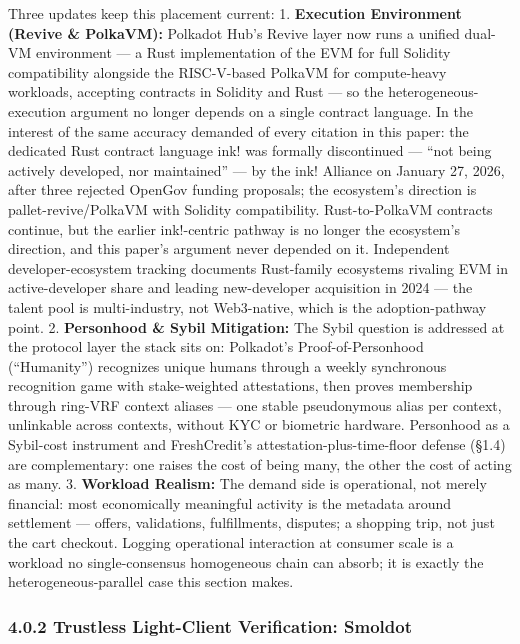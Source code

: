 \documentclass[
]{article}
\begin{document}
Three updates keep this placement current: 1. \textbf{Execution
Environment (Revive \& PolkaVM):} Polkadot Hub's Revive layer now runs a
unified dual-VM environment --- a Rust implementation of the EVM for
full Solidity compatibility alongside the RISC-V-based PolkaVM for
compute-heavy workloads, accepting contracts in Solidity and Rust --- so
the heterogeneous-execution argument no longer depends on a single
contract language. In the interest of the same accuracy demanded of
every citation in this paper: the dedicated Rust contract language ink!
was formally discontinued --- ``not being actively developed, nor
maintained'' --- by the ink! Alliance on January 27, 2026, after three
rejected OpenGov funding proposals; the ecosystem's direction is
pallet-revive/PolkaVM with Solidity compatibility. Rust-to-PolkaVM
contracts continue, but the earlier ink!-centric pathway is no longer
the ecosystem's direction, and this paper's argument never depended on
it. Independent developer-ecosystem tracking documents Rust-family
ecosystems rivaling EVM in active-developer share and leading
new-developer acquisition in 2024 --- the talent pool is multi-industry,
not Web3-native, which is the adoption-pathway point. 2.
\textbf{Personhood \& Sybil Mitigation:} The Sybil question is addressed
at the protocol layer the stack sits on: Polkadot's Proof-of-Personhood
(``Humanity'') recognizes unique humans through a weekly synchronous
recognition game with stake-weighted attestations, then proves
membership through ring-VRF context aliases --- one stable pseudonymous
alias per context, unlinkable across contexts, without KYC or biometric
hardware. Personhood as a Sybil-cost instrument and FreshCredit's
attestation-plus-time-floor defense (§1.4) are complementary: one raises
the cost of being many, the other the cost of acting as many. 3.
\textbf{Workload Realism:} The demand side is operational, not merely
financial: most economically meaningful activity is the metadata around
settlement --- offers, validations, fulfillments, disputes; a shopping
trip, not just the cart checkout. Logging operational interaction at
consumer scale is a workload no single-consensus homogeneous chain can
absorb; it is exactly the heterogeneous-parallel case this section
makes.

\subsubsection{4.0.2 Trustless Light-Client Verification:
Smoldot}\label{trustless-light-client-verification-smoldot}
\end{document}
